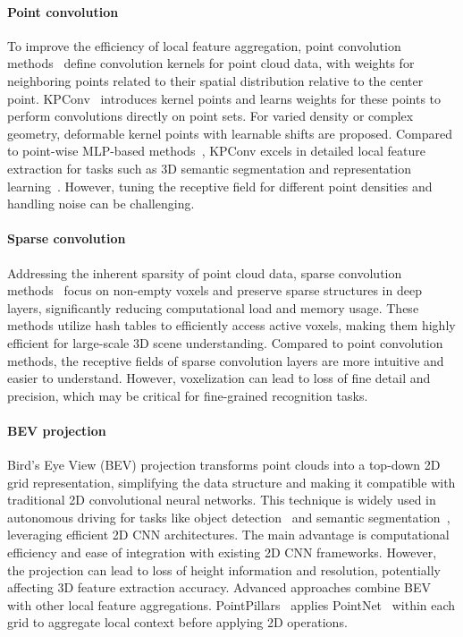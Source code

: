 \paragraph{Point convolution}
To improve the efficiency of local feature aggregation, point convolution methods~\cite{li2018pointcnn,wu2019pointconv,thomas2019kpconv} define convolution kernels for point cloud data, with weights for neighboring points related to their spatial distribution relative to the center point. KPConv~\cite{thomas2019kpconv} introduces kernel points and learns weights for these points to perform convolutions directly on point sets. For varied density or complex geometry, deformable kernel points with learnable shifts are proposed. Compared to point-wise MLP-based methods~\cite{qi2017pointnet,qi2017pointnet++}, KPConv excels in detailed local feature extraction for tasks such as 3D semantic segmentation and representation learning~\cite{bai2020d3feat}. However, tuning the receptive field for different point densities and handling noise can be challenging.

\paragraph{Sparse convolution}
Addressing the inherent sparsity of point cloud data, sparse convolution methods~\cite{tang2022torchsparse,hackel2020inference,3DSemanticSegmentationWithSubmanifoldSparseConvNet} focus on non-empty voxels and preserve sparse structures in deep layers, significantly reducing computational load and memory usage. These methods utilize hash tables to efficiently access active voxels, making them highly efficient for large-scale 3D scene understanding. Compared to point convolution methods, the receptive fields of sparse convolution layers are more intuitive and easier to understand. However, voxelization can lead to loss of fine detail and precision, which may be critical for fine-grained recognition tasks.

\paragraph{BEV projection}
Bird's Eye View (BEV) projection transforms point clouds into a top-down 2D grid representation, simplifying the data structure and making it compatible with traditional 2D convolutional neural networks. This technique is widely used in autonomous driving for tasks like object detection~\cite{zhou2018voxelnet,lang2019pointpillars} and semantic segmentation~\cite{aksoy2020salsanet}, leveraging efficient 2D CNN architectures. The main advantage is computational efficiency and ease of integration with existing 2D CNN frameworks. However, the projection can lead to loss of height information and resolution, potentially affecting 3D feature extraction accuracy. Advanced approaches combine BEV with other local feature aggregations. PointPillars~\cite{lang2019pointpillars} applies PointNet~\cite{qi2017pointnet} within each grid to aggregate local context before applying 2D operations.

